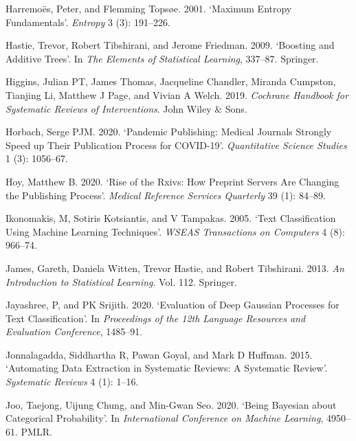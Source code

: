 \documentclass{article}
\newlength{\cslhangindent}
\newenvironment{CSLReferences}[2] %
 {%
  \setlength{\parindent}{0pt}
  \ifodd #1 \everypar{\setlength{\hangindent}{\cslhangindent}}\ignorespaces\fi
  \ifnum #2 > 0
  \setlength{\parskip}{#2\baselineskip}
  \fi
 }%
 {}
\begin{document}
\begin{CSLReferences}{1}{0}
\leavevmode{}%
Harremoës, Peter, and Flemming Topsøe. 2001. {`Maximum Entropy
Fundamentals'}. \emph{Entropy} 3 (3): 191--226.

\leavevmode{}%
Hastie, Trevor, Robert Tibshirani, and Jerome Friedman. 2009. {`Boosting
and Additive Trees'}. In \emph{The Elements of Statistical Learning},
337--87. Springer.

\leavevmode{}%
Higgins, Julian PT, James Thomas, Jacqueline Chandler, Miranda Cumpston,
Tianjing Li, Matthew J Page, and Vivian A Welch. 2019. \emph{Cochrane
Handbook for Systematic Reviews of Interventions}. John Wiley \& Sons.

\leavevmode{}%
Horbach, Serge PJM. 2020. {`Pandemic Publishing: Medical Journals
Strongly Speed up Their Publication Process for COVID-19'}.
\emph{Quantitative Science Studies} 1 (3): 1056--67.

\leavevmode{}%
Hoy, Matthew B. 2020. {`Rise of the Rxivs: How Preprint Servers Are
Changing the Publishing Process'}. \emph{Medical Reference Services
Quarterly} 39 (1): 84--89.

\leavevmode{}%
Ikonomakis, M, Sotiris Kotsiantis, and V Tampakas. 2005. {`Text
Classification Using Machine Learning Techniques'}. \emph{WSEAS
Transactions on Computers} 4 (8): 966--74.

\leavevmode{}%
James, Gareth, Daniela Witten, Trevor Hastie, and Robert Tibshirani.
2013. \emph{An Introduction to Statistical Learning}. Vol. 112.
Springer.

\leavevmode{}%
Jayashree, P, and PK Srijith. 2020. {`Evaluation of Deep Gaussian
Processes for Text Classification'}. In \emph{Proceedings of the 12th
Language Resources and Evaluation Conference}, 1485--91.

\leavevmode{}%
Jonnalagadda, Siddhartha R, Pawan Goyal, and Mark D Huffman. 2015.
{`Automating Data Extraction in Systematic Reviews: A Systematic
Review'}. \emph{Systematic Reviews} 4 (1): 1--16.

\leavevmode{}%
Joo, Taejong, Uijung Chung, and Min-Gwan Seo. 2020. {`Being Bayesian
about Categorical Probability'}. In \emph{International Conference on
Machine Learning}, 4950--61. PMLR.


\end{CSLReferences}
\end{document}
